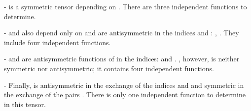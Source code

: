 \documentclass[a4paper,11pt,twoside]{article}
\begin{document}
\vspace*{0.1cm}

\noindent - \coordHE{}  \coordHE{} is a symmetric tensor depending on \coordHE{}. There are
three independent functions to determine.

\vspace*{0.1cm}

\noindent - \coordHE{}  \coordHE{} and \coordHE{} also depend only on
\coordHE{} and are antisymmetric in the indices \coordHE{} and \coordHE{}:
\coordHE{}, \coordHE{}. They include four
independent functions.

\vspace*{0.1cm}

\noindent - \coordHE{}  \coordHE{} and \coordHE{} are antisymmetric
functions of \coordHE{} in the indices: \coordHE{} and
\coordHE{}. \coordHE{}, however, is neither symmetric nor
antisymmetric; it contains four independent functions.

\vspace*{0.1cm}

\noindent - \coordHE{} Finally, \coordHE{} is antisymmetric in the exchange of the indices \coordHE{} and \coordHE{} and symmetric in the exchange of the pairs \coordHE{}. There is only one independent function to determine in this tensor.

\vspace*{0.1cm}
\end{document}

